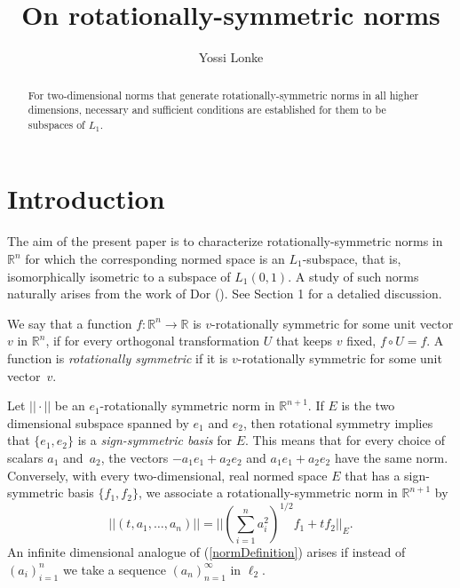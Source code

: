 \documentclass{article}[1100]
\title{On rotationally-symmetric norms}
\author{Yossi Lonke}
\theoremstyle{definition}
\theoremstyle{remark}
\newcommand\Ren[1]{\mathbb{R}^{#1}}
\newcommand\ar{\mathbb{R}}
\newcommand\norma[1]{|\!|#1|\!|}
\begin{document}
\maketitle









\begin{abstract}
For two-dimensional norms that generate rotationally-symmetric norms in all higher dimensions, necessary and
sufficient conditions are established for them to be subspaces of $L_1$. 
\end{abstract}

\maketitle


\section*{Introduction}
The aim of the present paper
is to characterize rotationally-symmetric norms in $\Ren{n}$ for which the corresponding normed space is an $L_1$-subspace, that is,  isomorphically  isometric to a subspace of $L_1(0,1)$. 
A study of such norms naturally arises from the work of Dor (\cite{Dor}). See Section 1 for a detalied discussion.

\medskip
We say that a function $f\colon\Ren{n}\to\ar$ is {$v$-rotationally symmetric} for some unit vector $v$ in $\Ren{n}$,  if
 for every orthogonal transformation $U$ that keeps $v$ fixed,  $f\circ U=f$. A function is \emph{rotationally symmetric}
 if it is $v$-rotationally symmetric for some unit vector~$v$.
 
 \medskip
Let $\norma{\cdot}$ be an $e_1$-rotationally symmetric norm in $\Ren{n+1}$. If $E$ is the two dimensional
subspace  spanned by $e_1$ and $e_2$, then rotational symmetry implies that $\{e_1 ,e_2\}$ is a \emph{sign-symmetric basis} for $E$.  This means that for every choice of  scalars $a_1$ and~$a_2$, the vectors $-a_1e_1+a_2e_2$ and
$a_1e_1+a_2e_2$ have the same norm. Conversely, with every  two-dimensional, real normed space $E$  that has a sign-symmetric basis $\{f_1,f_2\}$, we associate a rotationally-symmetric norm in $\Ren{n+1}$ by
\begin{equation}\label{normDefinition}
\norma{(t,a_1,\dots,a_n)}=\norma{(\sum_{i=1}^na_i^2)^{1/2}f_1+tf_2}_E.
\end{equation}
An infinite dimensional analogue of (\ref{normDefinition}) arises if instead of $(a_i)_{i=1}^n$ we take a sequence
$(a_n)_{n=1}^{\infty}$ in $\ell_2$. 
\end{document}
